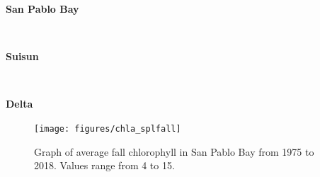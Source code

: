 \documentclass[
]{book}
\begin{document}
\begin{panel-grid}

\begin{columns-nocenter}

\begin{column800}

\textbf{San Pablo Bay}

\end{column800}

\begin{column40}

~

\end{column40}

\begin{column800}

\textbf{Suisun}

\end{column800}

\begin{column40}

~

\end{column40}

\begin{column800}

\textbf{Delta}

\end{column800}

\end{columns-nocenter}

\begin{columns-nocenter}

\begin{column800}

\begin{expand}

\begin{figure}
\texttt{[image: figures/chla\_splfall]} \caption{Graph of average fall chlorophyll in San Pablo Bay from 1975 to 2018. Values range from 4 to 15.}\label{fig:unnamed-chunk-108}
\end{figure}

\end{expand}

\end{column800}

\begin{column40}

~

\end{column40}


\end{columns-nocenter}
\end{panel-grid}
\end{document}
